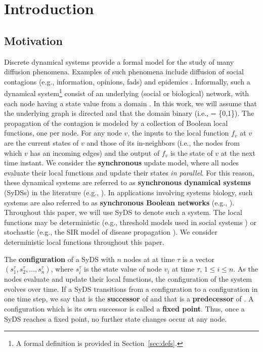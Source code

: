 \section{Introduction}
\label{sec:intro}

\subsection{Motivation}
\label{sse:motivation}


Discrete dynamical systems provide a formal model
for the study of many diffusion phenomena.
Examples of such phenomena include diffusion of social contagions
(e.g., information, opinions, fads) and epidemics
\cite{Adiga-etal-2019,Chistikov-etal-2020,OU-2020,MR-2007}.
Informally, such a dynamical system\footnote{A formal definition
is provided in Section~\ref{sec:defs}.}
consist of an underlying (social or biological) network, with each node having a
state value from a domain \bbb.
In this work, we will assume that the underlying
graph is directed and that the domain binary (i.e., \bbb{} = \{0,1\}).
The propagation of the contagion is modeled by a collection
of Boolean local functions, one per node.
For any node $v$, the inputs to the local function $f_v$ at $v$
are the current states of $v$ and those of its in-neighbors (i.e., the nodes
from which $v$ has an incoming edges) and the output of $f_v$
is the state of $v$ at the next time instant.
We consider the \textbf{synchronous} update model, where all
nodes evaluate their local functions and update their states
\emph{in parallel}.
For this reason, these dynamical systems are referred to
as \textbf{synchronous dynamical systems} (SyDSs) in
the literature (e.g., \cite{Adiga-etal-2019,Rosenkrantz-etal-2018}).
In applications involving systems biology, such systems are also
referred to as \textbf{synchronous Boolean networks}
(e.g., \cite{Kauffman-etal-2003,OU-2020,Akutsu-etal-2007}).
Throughout this paper, we will use SyDS to denote such a system.
The local functions may be deterministic (e.g., threshold models
used in social systems \cite{granovetter-1978}) or stochastic
(e.g., the SIR model of disease propagation \cite{Easley-Kleinberg-2010}).
We consider deterministic local functions throughout this paper.

The \textbf{configuration} of a SyDS with $n$ nodes at at time $\tau$ is a
vector $(s_1^{\tau}, s_2^{\tau}, \ldots, s_n^{\tau})$, where $s_i^{\tau}$
is the state value of node $v_i$ at time $\tau$, $1 \leq i \leq n$.
As the nodes evaluate and update their local functions, the configuration
of the system evolves over time.
If a SyDS transitions from a configuration \calc{} to a configuration \calcp{}
in one time step, we say that \calcp{} is the \textbf{successor} of \calc{} and that
\calc{} is a \textbf{predecessor} of \calcp.
A configuration \calc{} which is its own successor is called a
\textbf{fixed point}.
Thus, once a SyDS reaches a fixed point, no further state changes
occur at any node.

